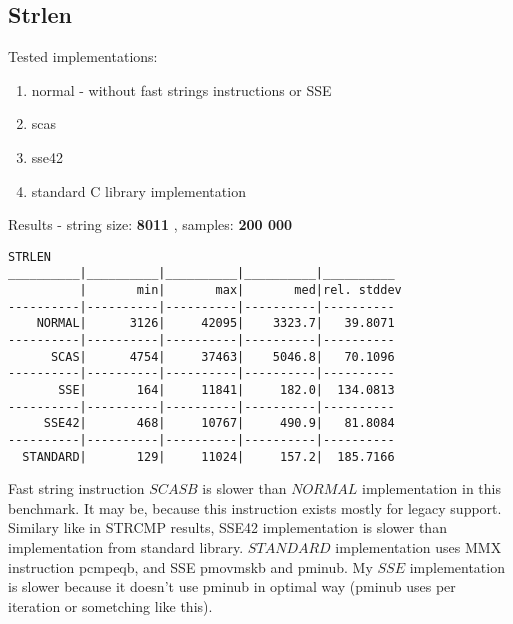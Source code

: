 \documentclass[11pt,a4paper]{article}
\begin{document}
\subsection{Strlen}\label{subsec:strlen}
    Tested implementations:
    \begin{enumerate}
        \item normal - without fast strings instructions or SSE
        \item scas
        \item sse42
        \item standard C library implementation
    \end{enumerate}
Results - string size: \textbf{8011} , samples: \textbf{200 000}
\begin{lstlisting}[]
STRLEN
__________|__________|__________|__________|__________
          |       min|       max|       med|rel. stddev
----------|----------|----------|----------|----------
    NORMAL|      3126|     42095|    3323.7|   39.8071
----------|----------|----------|----------|----------
      SCAS|      4754|     37463|    5046.8|   70.1096
----------|----------|----------|----------|----------
       SSE|       164|     11841|     182.0|  134.0813
----------|----------|----------|----------|----------
     SSE42|       468|     10767|     490.9|   81.8084
----------|----------|----------|----------|----------
  STANDARD|       129|     11024|     157.2|  185.7166
\end{lstlisting}

Fast string instruction $SCASB$ is slower than $NORMAL$ implementation in this benchmark.
It may be, because this instruction exists mostly for legacy support.
Similary like in STRCMP results, SSE42 implementation is slower than implementation from standard library.
$STANDARD$ implementation uses MMX instruction pcmpeqb, and SSE pmovmskb and pminub.
My $SSE$ implementation is slower because it doesn't use pminub in optimal way (pminub uses per iteration or sometching like this).
\end{document}
